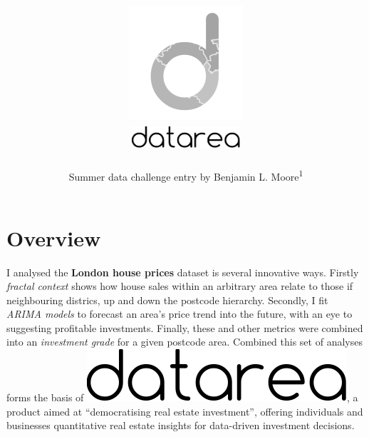 \documentclass[
10pt, %
a4paper, %
oneside, %
headinclude,footinclude, %
BCOR5mm, %
]{scrartcl}
\title{ \vspace{-3em}
\includegraphics[width=.1\textwidth]{Figures/logo.png} \\
\includegraphics[width=4cm]{Figures/datarea.pdf} \\
} %
\author{  Summer data challenge entry by Benjamin
  L. Moore\textsuperscript{1} } %
\date{} %
\newcommand*{\logo}{\includegraphics[scale=.22]{Figures/datarea.pdf}}
\begin{document}

\renewcommand{\sectionmark}[1]{\markright{\spacedlowsmallcaps{summerdatachallenge}}} %
\lehead{\mbox{\llap{\small\thepage\kern1em\color{halfgray} \vline}\color{halfgray}\hspace{0.5em}\rightmark\hfil}} %

\pagestyle{scrheadings} %


\maketitle %

\setcounter{tocdepth}{2} %




\vspace{-4em}
\section*{Overview} 

I analysed the {\bf London house prices} dataset is several innovative
ways. Firstly \emph{fractal context} shows how house sales within an
arbitrary area relate to those if neighbouring districs, up and down
the postcode hierarchy. Secondly, I fit \emph{ARIMA models} to
forecast an area's price trend into the future, with an eye to
suggesting profitable investments. Finally, these and other metrics
were combined into an \emph{investment grade} for a given postcode
area. Combined this set of analyses forms the basis of \logo, a
product aimed at ``democratising real estate investment'', offering
individuals and businesses quantitative real estate insights for
data-driven investment decisions.
\end{document}
